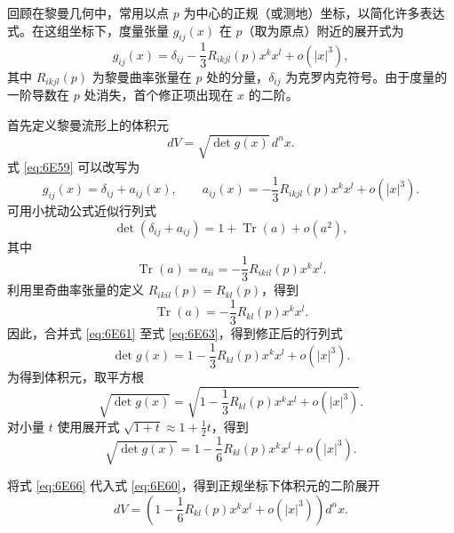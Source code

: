 回顾在黎曼几何中，常用以点 $p$ 为中心的正规（或测地）坐标，以简化许多表达式。在这组坐标下，度量张量 $g_{ij}(x)$ 在 $p$（取为原点）附近的展开式为
\begin{equation*}
  g_{ij}(x)=\delta_{ij}-\frac13R_{ikjl}(p)x^kx^l+o(|x|^3),
  \tag{6E59}\label{eq:6E59}
\end{equation*}
其中 $R_{ikjl}(p)$ 为黎曼曲率张量在 $p$ 处的分量，$\delta_{ij}$ 为克罗内克符号。由于度量的一阶导数在 $p$ 处消失，首个修正项出现在 $x$ 的二阶。

首先定义黎曼流形上的体积元
\begin{equation*}
  dV=\sqrt{\det g(x)}\,d^n x.
  \tag{6E60}\label{eq:6E60}
\end{equation*}
式 \eqref{eq:6E59} 可以改写为
\begin{equation*}
  g_{ij}(x)=\delta_{ij}+a_{ij}(x),\qquad
  a_{ij}(x)=-\frac13R_{ikjl}(p)x^kx^l+o(|x|^3).
  \tag{6E61}\label{eq:6E61}
\end{equation*}
可用小扰动公式近似行列式
\begin{equation*}
  \det(\delta_{ij}+a_{ij})=1+\operatorname{Tr}(a)+o(a^2),
  \tag{6E62}\label{eq:6E62}
\end{equation*}
其中
\[
  \operatorname{Tr}(a)=a_{ii}=-\frac13R_{ikil}(p)x^kx^l.
\]
利用里奇曲率张量的定义 $R_{ikil}(p)=R_{kl}(p)$，得到
\begin{equation*}
  \operatorname{Tr}(a)=-\frac13R_{kl}(p)x^kx^l.
  \tag{6E63}\label{eq:6E63}
\end{equation*}
因此，合并式 \eqref{eq:6E61} 至式 \eqref{eq:6E63}，得到修正后的行列式
\begin{equation*}
  \det g(x)=1-\frac13R_{kl}(p)x^kx^l+o(|x|^3).
  \tag{6E64}\label{eq:6E64}
\end{equation*}
为得到体积元，取平方根
\begin{equation*}
  \sqrt{\det g(x)}=\sqrt{1-\frac13R_{kl}(p)x^kx^l+o(|x|^3)}.
  \tag{6E65}\label{eq:6E65}
\end{equation*}
对小量 $t$ 使用展开式 $\sqrt{1+t}\approx1+\frac12 t$，得到
\begin{equation*}
  \sqrt{\det g(x)}=1-\frac16R_{kl}(p)x^kx^l+o(|x|^3).
  \tag{6E66}\label{eq:6E66}
\end{equation*}

将式 \eqref{eq:6E66} 代入式 \eqref{eq:6E60}，得到正规坐标下体积元的二阶展开
\begin{equation*}
  dV=\left(1-\frac16R_{kl}(p)x^kx^l+o(|x|^3)\right)d^n x.
  \tag{6E67}\label{eq:6E67}
\end{equation*}

